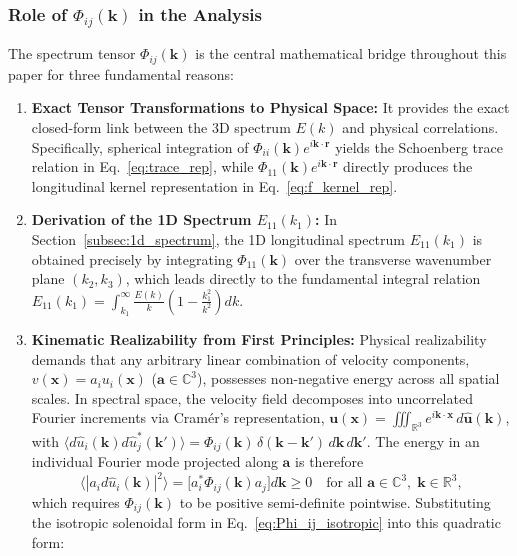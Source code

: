 \documentclass[lineno]{jfm}
\begin{document}
\subsubsection{Role of \texorpdfstring{$\Phi_{ij}(\mathbf{k})$}{Phi\_ij(k)} in the Analysis}
The spectrum tensor $\Phi_{ij}(\mathbf{k})$ is the central mathematical bridge throughout this paper for three fundamental reasons:
\begin{enumerate}
\item \textbf{Exact Tensor Transformations to Physical Space:} It provides the exact closed-form link between the 3D spectrum $E(k)$ and physical correlations. Specifically, spherical integration of $\Phi_{ii}(\mathbf{k}) e^{i\mathbf{k}\cdot\mathbf{r}}$ yields the Schoenberg trace relation in Eq.~\eqref{eq:trace_rep}, while $\Phi_{11}(\mathbf{k}) e^{i\mathbf{k}\cdot\mathbf{r}}$ directly produces the longitudinal kernel representation in Eq.~\eqref{eq:f_kernel_rep}.
\item \textbf{Derivation of the 1D Spectrum $E_{11}(k_1)$:} In Section~\ref{subsec:1d_spectrum}, the 1D longitudinal spectrum $E_{11}(k_1)$ is obtained precisely by integrating $\Phi_{11}(\mathbf{k})$ over the transverse wavenumber plane $(k_2, k_3)$, which leads directly to the fundamental integral relation $E_{11}(k_1) = \int_{k_1}^\infty \frac{E(k)}{k}\left(1 - \frac{k_1^2}{k^2}\right)dk$.
\item \textbf{Kinematic Realizability from First Principles:}
Physical realizability demands that any arbitrary linear combination of velocity components, $v(\mathbf{x}) = a_i u_i(\mathbf{x})$ ($\mathbf{a} \in \mathbb{C}^3$), possesses non-negative energy across all spatial scales. In spectral space, the velocity field decomposes into uncorrelated Fourier increments via Cram\'er's representation, $\mathbf{u}(\mathbf{x}) = \iiint_{\mathbb{R}^3} e^{i\mathbf{k}\cdot\mathbf{x}}\, d\hat{\mathbf{u}}(\mathbf{k})$, with $\langle d\hat{u}_i(\mathbf{k}) d\hat{u}_j^*(\mathbf{k}') \rangle = \Phi_{ij}(\mathbf{k})\,\delta(\mathbf{k}-\mathbf{k}')\,d\mathbf{k}\,d\mathbf{k}'$. The energy in an individual Fourier mode projected along $\mathbf{a}$ is therefore
\begin{equation}
\langle |a_i d\hat{u}_i(\mathbf{k})|^2 \rangle = \Big[ a_i^* \Phi_{ij}(\mathbf{k}) a_j \Big] d\mathbf{k} \ge 0 \quad \text{for all } \mathbf{a} \in \mathbb{C}^3, \; \mathbf{k} \in \mathbb{R}^3,
\label{eq:quadratic_form_realizability}
\end{equation}
which requires $\Phi_{ij}(\mathbf{k})$ to be positive semi-definite pointwise. Substituting the isotropic solenoidal form in Eq.~\eqref{eq:Phi_ij_isotropic} into this quadratic form:

\end{enumerate}
\end{document}
